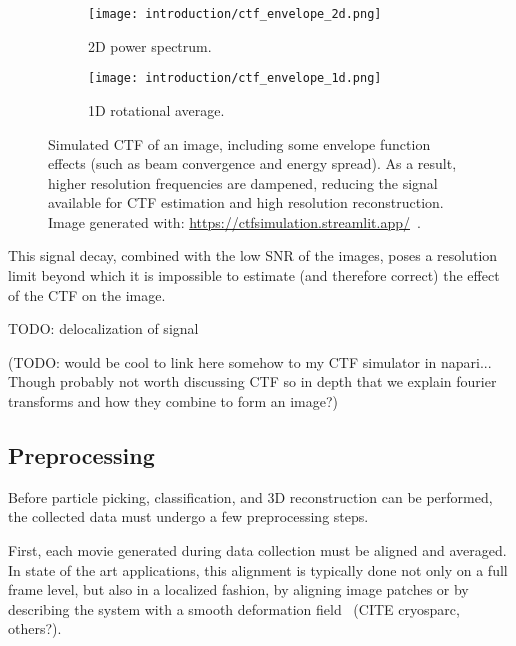 \begin{figure}[ht]
    \centering
    \begin{subfigure}[B]{.42\textwidth}
        \centering
        \texttt{[image: introduction/ctf\_envelope\_2d.png]}
        \caption{2D power spectrum.}
        \label{fig:ctf_envelope_2d}
    \end{subfigure}%
    \hfill
    \begin{subfigure}[B]{.55\textwidth}
        \centering
        \texttt{[image: introduction/ctf\_envelope\_1d.png]}
        \caption{1D rotational average.}
        \label{fig:ctf_envelope_1d}
    \end{subfigure}%
    \caption[CTF: effect of the envelope function]{Simulated CTF of an image, including some envelope function effects (such as beam convergence and energy spread). As a result, higher resolution frequencies are dampened, reducing the signal available for CTF estimation and high resolution reconstruction. Image generated with: \url{https://ctfsimulation.streamlit.app/}~\cite{jiangWebbasedSimulationContrast2001}.}
    \label{fig:ctf_envelope}
\end{figure}

This signal decay, combined with the low SNR of the images, poses a resolution limit beyond which it is impossible to estimate (and therefore correct) the effect of the CTF on the image.

TODO: delocalization of signal

(TODO: would be cool to link here somehow to my CTF simulator in napari... Though probably not worth discussing CTF so in depth that we explain fourier transforms and how they combine to form an image?)

\subsection{Preprocessing}

Before particle picking, classification, and 3D reconstruction can be performed, the collected data must undergo a few preprocessing steps.

First, each movie generated during data collection must be aligned and averaged.
In state of the art applications, this alignment is typically done not only on a full frame level, but also in a localized fashion, by aligning image patches or by describing the system with a smooth deformation field~\cite{zhengMotionCor2AnisotropicCorrection2017} (CITE cryosparc, others?).

